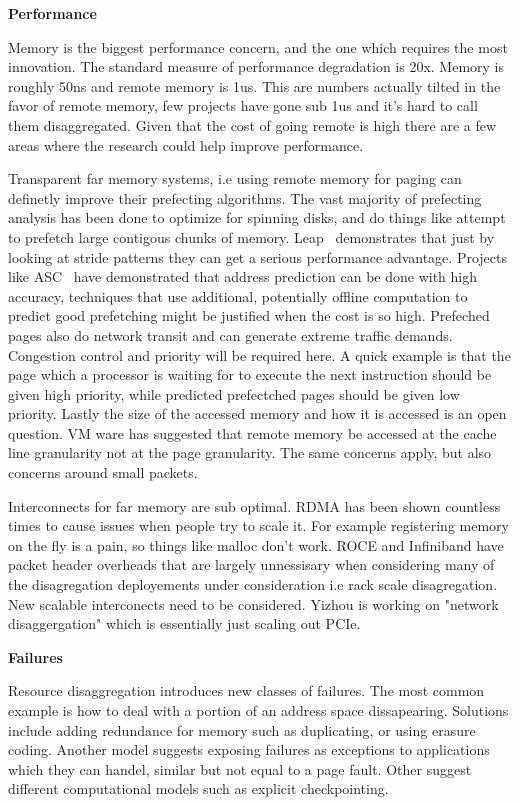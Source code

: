 \textbf{Performance}

Memory is the biggest performance concern, and the one which requires the most
innovation. The standard measure of performance degradation is 20x. Memory is
roughly 50ns and remote memory is 1us. This are numbers actually tilted in the
favor of remote memory, few projects have gone sub 1us and it's hard to call
them disaggregated. Given that the cost of going remote is high there are a few
areas where the research could help improve performance.

Transparent far memory systems, i.e using remote memory for paging can definetly
improve their prefecting algorithms. The vast majority of prefecting analysis
has been done to optimize for spinning disks, and do things like attempt to
prefetch large contigous chunks of memory. Leap~\cite{leap} demonstrates that
just by looking at stride patterns they can get a serious performance advantage.
Projects like ASC~\cite{asc} have demonstrated that address prediction can be
done with high accuracy, techniques that use additional, potentially offline
computation to predict good prefetching might be justified when the cost is so
high. Prefeched pages also do network transit and can generate extreme traffic
demands. Congestion control and priority will be required here. A quick example
is that the page which a processor is waiting for to execute the next
instruction should be given high priority, while predicted prefectched pages
should be given low priority. Lastly the size of the accessed memory and how it
is accessed is an open question. VM ware has suggested that remote memory be
accessed at the cache line granularity not at the page granularity. The same
concerns apply, but also concerns around small packets.

Interconnects for far memory are sub optimal. RDMA has been shown countless
times to cause issues when people try to scale it. For example registering
memory on the fly is a pain, so things like malloc don't work. ROCE and
Infiniband have packet header overheads that are largely unnessisary when
considering many of the disagregation deployements under consideration i.e rack
scale disagregation. New scalable interconects need to be considered. Yizhou is
working on "network disaggergation" which is essentially just scaling out PCIe.



\textbf{Failures}

Resource disaggregation introduces new classes of failures. The most common
example is how to deal with a portion of an address space dissapearing.
Solutions include adding redundance for memory such as duplicating, or using
erasure coding. Another model suggests exposing failures as exceptions to
applications which they can handel, similar but not equal to a page fault. Other
suggest different computational models such as explicit checkpointing. 

